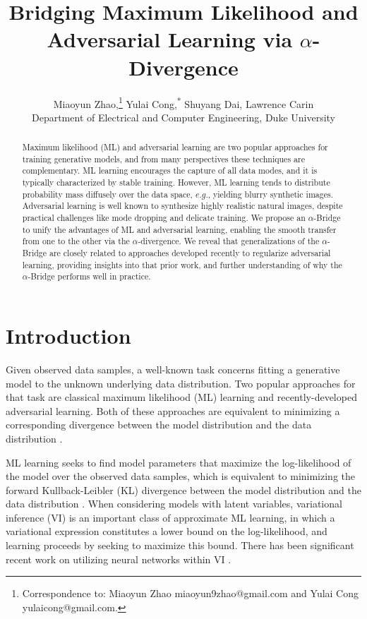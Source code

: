 \documentclass[letterpaper]{article} %
\title{Bridging Maximum Likelihood and Adversarial Learning via $\alpha$-Divergence}
\author{
	Miaoyun Zhao,\thanks{Correspondence to: Miaoyun Zhao {miaoyun9zhao@gmail.com} and Yulai Cong {yulaicong@gmail.com}.}
	Yulai Cong,\textsuperscript{*}
	Shuyang Dai,
	Lawrence Carin
	\\
	Department of Electrical and Computer Engineering, Duke University\\
}
\begin{document}
\maketitle

\begin{abstract}

Maximum likelihood (ML) and adversarial learning are two popular approaches for training generative models, and from many perspectives these techniques are complementary. ML learning encourages the capture of all data modes, and it is typically characterized by stable training. However, ML learning tends to distribute probability mass diffusely over the data space, $e.g.$, yielding blurry synthetic images. Adversarial learning is well known to synthesize highly realistic natural images, despite practical challenges like mode dropping and delicate training. We propose an $\alpha$-Bridge to unify the advantages of ML and adversarial learning, enabling the smooth transfer from one to the other via the $\alpha$-divergence. We reveal that generalizations of the $\alpha$-Bridge are closely related to approaches developed recently to regularize adversarial learning,  providing insights into that prior work, and further understanding of why the $\alpha$-Bridge performs well in practice.

\end{abstract}



\section{Introduction}
\label{sec:Intro}


Given observed data samples, a well-known task concerns fitting a generative model to the unknown underlying data distribution. Two popular approaches for that task are classical maximum likelihood (ML) learning and recently-developed adversarial learning. Both of these approaches are equivalent to minimizing a corresponding divergence between the model distribution and the data distribution \cite{bishop_2006_PRML,goodfellow2014generative}.


ML learning seeks to find model parameters that maximize the log-likelihood of the model over the observed data samples, which is equivalent to minimizing the forward Kullback-Leibler (KL) divergence between the model distribution and the data distribution \cite{mclachlan2007algorithm}.
When considering models with latent variables, variational inference (VI) \cite{jordan1999introduction,blei2006variational} is an important class of approximate ML learning, in which a variational expression constitutes a lower bound on the log-likelihood, and learning proceeds by seeking to maximize this bound.
There has been significant recent work on utilizing neural networks within VI \cite{kingma2014auto,dai2018diagnosing}.
\end{document}
